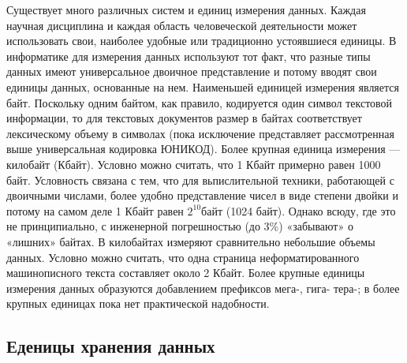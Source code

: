 \documentclass[a4paper]{article}
\begin{document}
Существует много различных систем и единиц измерения данных. Каждая научная дисциплина и каждая область человеческой деятельности может использовать свои, наиболее удобные или традиционно устоявшиеся единицы. В информатике для измерения данных используют тот факт, что разные типы данных имеют универсальное двоичное представление и потому вводят свои единицы данных, основанные на нем. Наименьшей единицей измерения является байт. Поскольку одним байтом, как правило, кодируется один символ текстовой информации, то для текстовых документов размер в байтах соответствует лексическому объему в символах (пока исключение представляет рассмотренная выше универсальная кодировка ЮНИКОД). Более крупная единица измерения — килобайт (Кбайт). Условно можно считать, что 1 Кбайт примерно равен 1000 байт. Условность связана с тем, что для вьпислительной техники, работающей с двоичными числами, более удобно представление чисел в виде степени двойки и потому на самом деле 1 Кбайт равен $2^{10}байт$ (1024 байт). Однако всюду, где это не принципиально, с инженерной погрешностью (до 3\%) «забывают» о «лишних» байтах. В килобайтах измеряют сравнительно небольшие объемы данных. Условно можно считать, что одна страница неформатированного машинописного текста составляет около 2 Кбайт. Более крупные единицы измерения данных образуются добавлением префиксов мега-, гига- тера-; в более крупных единицах пока нет практической надобности.

\subsection{Еденицы хранения данных}
\end{document}
